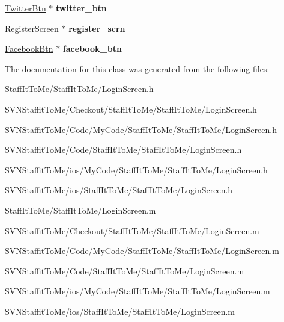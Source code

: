 \begin{DoxyCompactItemize}
\item 
\hypertarget{interface_login_screen_a756ca102c5b6bf3069934d446dd1d4cf}{
\hyperlink{interface_twitter_btn}{\-Twitter\-Btn} $\ast$ {\bfseries twitter\-\_\-btn}}
\label{interface_login_screen_a756ca102c5b6bf3069934d446dd1d4cf}

\item 
\hypertarget{interface_login_screen_a1576ffee04a40691551af9d7e7874348}{
\hyperlink{interface_register_screen}{\-Register\-Screen} $\ast$ {\bfseries register\-\_\-scrn}}
\label{interface_login_screen_a1576ffee04a40691551af9d7e7874348}

\item 
\hypertarget{interface_login_screen_a251bbccc10e21962a6f5f6e05bfb4520}{
\hyperlink{interface_facebook_btn}{\-Facebook\-Btn} $\ast$ {\bfseries facebook\-\_\-btn}}
\label{interface_login_screen_a251bbccc10e21962a6f5f6e05bfb4520}

\end{DoxyCompactItemize}


\-The documentation for this class was generated from the following files\-:\begin{DoxyCompactItemize}
\item 
\-Staff\-It\-To\-Me/\-Staff\-It\-To\-Me/\-Login\-Screen.\-h\item 
\-S\-V\-N\-Staffit\-To\-Me/\-Checkout/\-Staff\-It\-To\-Me/\-Staff\-It\-To\-Me/\-Login\-Screen.\-h\item 
\-S\-V\-N\-Staffit\-To\-Me/\-Code/\-My\-Code/\-Staff\-It\-To\-Me/\-Staff\-It\-To\-Me/\-Login\-Screen.\-h\item 
\-S\-V\-N\-Staffit\-To\-Me/\-Code/\-Staff\-It\-To\-Me/\-Staff\-It\-To\-Me/\-Login\-Screen.\-h\item 
\-S\-V\-N\-Staffit\-To\-Me/ios/\-My\-Code/\-Staff\-It\-To\-Me/\-Staff\-It\-To\-Me/\-Login\-Screen.\-h\item 
\-S\-V\-N\-Staffit\-To\-Me/ios/\-Staff\-It\-To\-Me/\-Staff\-It\-To\-Me/\-Login\-Screen.\-h\item 
\-Staff\-It\-To\-Me/\-Staff\-It\-To\-Me/\-Login\-Screen.\-m\item 
\-S\-V\-N\-Staffit\-To\-Me/\-Checkout/\-Staff\-It\-To\-Me/\-Staff\-It\-To\-Me/\-Login\-Screen.\-m\item 
\-S\-V\-N\-Staffit\-To\-Me/\-Code/\-My\-Code/\-Staff\-It\-To\-Me/\-Staff\-It\-To\-Me/\-Login\-Screen.\-m\item 
\-S\-V\-N\-Staffit\-To\-Me/\-Code/\-Staff\-It\-To\-Me/\-Staff\-It\-To\-Me/\-Login\-Screen.\-m\item 
\-S\-V\-N\-Staffit\-To\-Me/ios/\-My\-Code/\-Staff\-It\-To\-Me/\-Staff\-It\-To\-Me/\-Login\-Screen.\-m\item 
\-S\-V\-N\-Staffit\-To\-Me/ios/\-Staff\-It\-To\-Me/\-Staff\-It\-To\-Me/\-Login\-Screen.\-m\end{DoxyCompactItemize}
